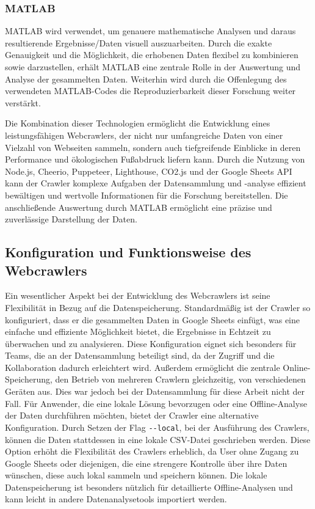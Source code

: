 \documentclass[Bachelor,BIF,german,IEEE]{BASE/twbook}
\begin{document}
\subsubsection{MATLAB}
MATLAB \cite{MAL24} wird verwendet, um genauere mathematische Analysen und daraus resultierende Ergebnisse/Daten visuell auszuarbeiten. Durch die exakte Genauigkeit und die Möglichkeit, die erhobenen Daten flexibel zu kombinieren sowie darzustellen, erhält MATLAB eine zentrale Rolle in der Auswertung und Analyse der gesammelten Daten. Weiterhin wird durch die Offenlegung des verwendeten MATLAB-Codes die Reproduzierbarkeit dieser Forschung weiter verstärkt.\newline

\noindent Die Kombination dieser Technologien ermöglicht die Entwicklung eines leistungsfähigen Webcrawlers, der nicht nur umfangreiche Daten von einer Vielzahl von Webseiten sammeln, sondern auch tiefgreifende Einblicke in deren Performance und ökologischen Fußabdruck liefern kann. Durch die Nutzung von Node.js, Cheerio, Puppeteer, Lighthouse, CO2.js und der Google Sheets API kann der Crawler komplexe Aufgaben der Datensammlung und -analyse effizient bewältigen und wertvolle Informationen für die Forschung bereitstellen. Die anschließende Auswertung durch MATLAB ermöglicht eine präzise und zuverlässige Darstellung der Daten.

\subsection{Konfiguration und Funktionsweise des Webcrawlers}
\noindent Ein wesentlicher Aspekt bei der Entwicklung des Webcrawlers ist seine Flexibilität in Bezug auf die Datenspeicherung. Standardmäßig ist der Crawler so konfiguriert, dass er die gesammelten Daten in Google Sheets einfügt, was eine einfache und effiziente Möglichkeit bietet, die Ergebnisse in Echtzeit zu überwachen und zu analysieren. Diese Konfiguration eignet sich besonders für Teams, die an der Datensammlung beteiligt sind, da der Zugriff und die Kollaboration dadurch erleichtert wird. Außerdem ermöglicht die zentrale Online-Speicherung, den Betrieb von mehreren Crawlern gleichzeitig, von verschiedenen Geräten aus. Dies war jedoch bei der Datensammlung für diese Arbeit nicht der Fall.
Für Anwender, die eine lokale Lösung bevorzugen oder eine Offline-Analyse der Daten durchführen möchten, bietet der Crawler eine alternative Konfiguration. Durch Setzen der Flag \texttt{{-}{-}local}, bei der Ausführung des Crawlers, können die Daten stattdessen in eine lokale CSV-Datei geschrieben werden. Diese Option erhöht die Flexibilität des Crawlers erheblich, da User ohne Zugang zu Google Sheets oder diejenigen, die eine strengere Kontrolle über ihre Daten wünschen, diese auch lokal sammeln und speichern können. Die lokale Datenspeicherung ist besonders nützlich für detaillierte Offline-Analysen und kann leicht in andere Datenanalysetools importiert werden.
\end{document}
